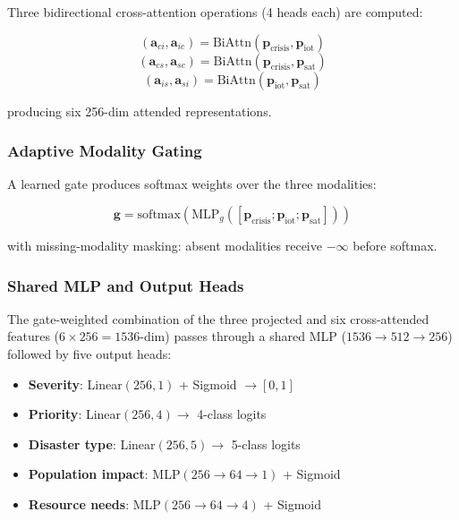 \documentclass[journal]{IEEEtran}
\begin{document}
Three bidirectional cross-attention operations (4 heads each) are computed:

\begin{equation}
(\mathbf{a}_{ci}, \mathbf{a}_{ic}) = \text{BiAttn}(\mathbf{p}_\text{crisis}, \mathbf{p}_\text{iot})
\end{equation}
\begin{equation}
(\mathbf{a}_{cs}, \mathbf{a}_{sc}) = \text{BiAttn}(\mathbf{p}_\text{crisis}, \mathbf{p}_\text{sat})
\end{equation}
\begin{equation}
(\mathbf{a}_{is}, \mathbf{a}_{si}) = \text{BiAttn}(\mathbf{p}_\text{iot}, \mathbf{p}_\text{sat})
\end{equation}

producing six 256-dim attended representations.

\subsubsection{Adaptive Modality Gating}

A learned gate produces softmax weights over the three modalities:

\begin{equation}
\mathbf{g} = \text{softmax}(\text{MLP}_g([\mathbf{p}_\text{crisis}; \mathbf{p}_\text{iot}; \mathbf{p}_\text{sat}]))
\end{equation}

with missing-modality masking: absent modalities receive $-\infty$ before softmax.

\subsubsection{Shared MLP and Output Heads}

The gate-weighted combination of the three projected and six cross-attended features ($6 \times 256 = 1536$-dim) passes through a shared MLP ($1536 \to 512 \to 256$) followed by five output heads:

\begin{itemize}
    \item \textbf{Severity}: Linear$(256,1)$ + Sigmoid $\to [0,1]$
    \item \textbf{Priority}: Linear$(256,4) \to$ 4-class logits
    \item \textbf{Disaster type}: Linear$(256,5) \to$ 5-class logits
    \item \textbf{Population impact}: MLP$(256 \to 64 \to 1)$ + Sigmoid
    \item \textbf{Resource needs}: MLP$(256 \to 64 \to 4)$ + Sigmoid
\end{itemize}
\end{document}
